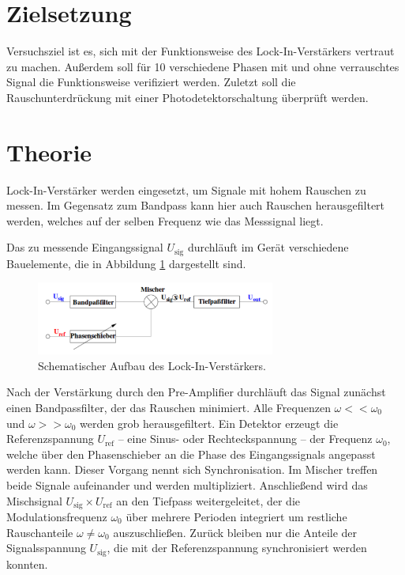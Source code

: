 \section{Zielsetzung}

Versuchsziel ist es, sich mit der Funktionsweise des Lock-In-Verstärkers vertraut zu machen. Außerdem soll für 10 verschiedene Phasen mit und ohne verrauschtes Signal die Funktionsweise verifiziert werden. Zuletzt soll die Rauschunterdrückung mit einer Photodetektorschaltung überprüft werden.

\section{Theorie}
\label{sec:Theorie}

Lock-In-Verstärker werden eingesetzt, um Signale mit hohem Rauschen zu messen. 
Im Gegensatz zum Bandpass kann hier auch Rauschen herausgefiltert werden, welches auf der selben Frequenz wie das Messsignal liegt.

Das zu messende Eingangssignal $U_\mathup{sig}$ durchläuft im Gerät verschiedene Bauelemente, die in Abbildung \ref{fig:lockin} dargestellt sind.
\begin{figure}
	\centering
		\includegraphics[width=0.7\textwidth]{Bilder/LOCK_IN.pdf}
		\caption{Schematischer Aufbau des Lock-In-Verstärkers.}
		\label{fig:lockin}
	\end{figure}

Nach der Verstärkung durch den Pre-Amplifier durchläuft das Signal zunächst einen Bandpassfilter, der das Rauschen minimiert. 
Alle Frequenzen $\omega<<\omega_0$ und $\omega>>\omega_0$ werden grob herausgefiltert.
Ein Detektor erzeugt die Referenzspannung $U_\mathup{ref}$ -- eine Sinus- oder Rechteckspannung -- der Frequenz $\omega_0$, welche über den Phasenschieber an die Phase des Eingangssignals angepasst werden kann. 
Dieser Vorgang nennt sich Synchronisation.
Im Mischer treffen beide Signale aufeinander und werden multipliziert. Anschließend wird das Mischsignal $U_\mathup{sig}\times U_\mathup{ref}$ an den Tiefpass weitergeleitet, der die Modulationsfrequenz $\omega_0$ über mehrere Perioden integriert um restliche Rauschanteile $\omega\neq\omega_0$ auszuschließen. Zurück bleiben nur die Anteile der Signalsspannung $U_\mathup{sig}$, die mit der Referenzspannung synchronisiert werden konnten.


